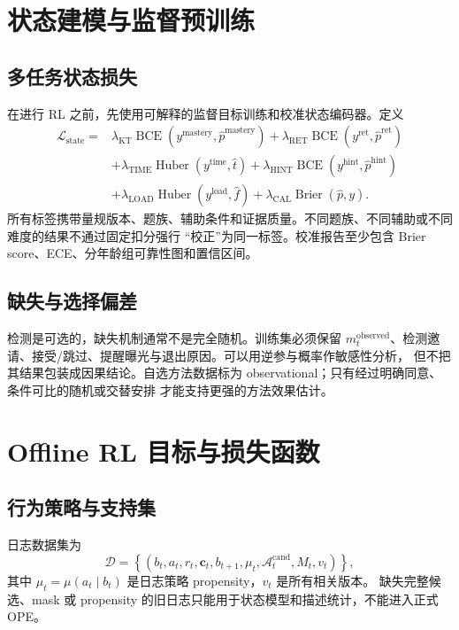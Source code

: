 \documentclass[11pt,a4paper,fontset=none]{ctexart}
\DeclareMathOperator{\BCE}{BCE}
\DeclareMathOperator{\Huber}{Huber}
\DeclareMathOperator{\Brier}{Brier}
\newcommand{\1}{\mathbb{I}}
\newcommand{\D}{\mathcal{D}}
\begin{document}
\section{状态建模与监督预训练}

\subsection{多任务状态损失}

在进行 RL 之前，先使用可解释的监督目标训练和校准状态编码器。定义
\begin{align}
  \mathcal{L}_{\mathrm{state}}={}&
    \lambda_{\mathrm{KT}}\BCE(y^{\mathrm{mastery}},\widehat p^{\mathrm{mastery}})
    +\lambda_{\mathrm{RET}}\BCE(y^{\mathrm{ret}},\widehat p^{\mathrm{ret}})\nonumber\\
    &+\lambda_{\mathrm{TIME}}\Huber(y^{\mathrm{time}},\widehat t)
    +\lambda_{\mathrm{HINT}}\BCE(y^{\mathrm{hint}},\widehat p^{\mathrm{hint}})\nonumber\\
    &+\lambda_{\mathrm{LOAD}}\Huber(y^{\mathrm{load}},\widehat f)
    +\lambda_{\mathrm{CAL}}\Brier(\widehat p,y).
  \label{eq:state-loss}
\end{align}
所有标签携带量规版本、题族、辅助条件和证据质量。不同题族、不同辅助或不同难度的结果不通过固定扣分强行
“校正”为同一标签。校准报告至少包含 Brier score、ECE、分年龄组可靠性图和置信区间。

\subsection{缺失与选择偏差}

检测是可选的，缺失机制通常不是完全随机。训练集必须保留
$m_t^{\mathrm{observed}}$、检测邀请、接受/跳过、提醒曝光与退出原因。可以用逆参与概率作敏感性分析，
但不把其结果包装成因果结论。自选方法数据标为 observational；只有经过明确同意、条件可比的随机或交替安排
才能支持更强的方法效果估计。

\section{Offline RL 目标与损失函数}

\subsection{行为策略与支持集}

日志数据集为
\begin{equation}
  \D=\left\{(b_t,a_t,r_t,\bm c_t,b_{t+1},\mu_t,
  \mathcal{A}_t^{\mathrm{cand}},M_t,v_t)\right\},
\end{equation}
其中 $\mu_t=\mu(a_t\mid b_t)$ 是日志策略 propensity，$v_t$ 是所有相关版本。
缺失完整候选、mask 或 propensity 的旧日志只能用于状态模型和描述统计，不能进入正式 OPE。
\end{document}
